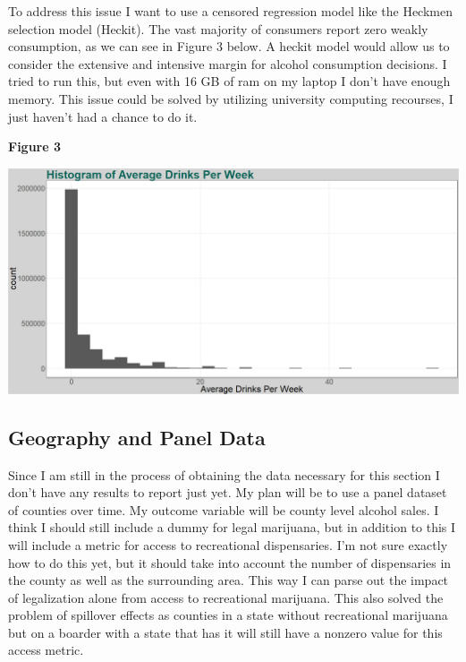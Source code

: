 \documentclass[11pt]{article}
\begin{document}
To address this issue I want to use a censored regression model like the Heckmen selection model (Heckit). The vast majority of consumers report zero weakly consumption, as we can see in Figure 3 below. A heckit model would allow us to consider the extensive and intensive margin for alcohol consumption decisions. I tried to run this, but even with 16 GB of ram on my laptop I don't have enough memory. This issue could be solved by utilizing university computing recourses, I just haven't had a chance to do it. 

\begin{center}
	
	\centering
	\textbf{Figure 3}\par\medskip
	\includegraphics[width=1\linewidth]{Hist_nm_aved_week.png}
\end{center}



\subsection{Geography and Panel Data}  

Since I am still in the process of obtaining the data necessary for this section I don't have any results to report just yet. My plan will be to use a panel dataset of counties over time. My outcome variable will be county level alcohol sales. I think I should still include a dummy for legal marijuana, but in addition to this I will include a metric for access to recreational dispensaries. I'm not sure exactly how to do this yet, but it should take into account the number of dispensaries in the county as well as the surrounding area. This way I can parse out the impact of legalization alone from access to recreational marijuana. This also solved the problem of spillover effects as counties in a state without recreational marijuana but on a boarder with a state that has it will still have a nonzero value for this access metric. \par 
\end{document}
